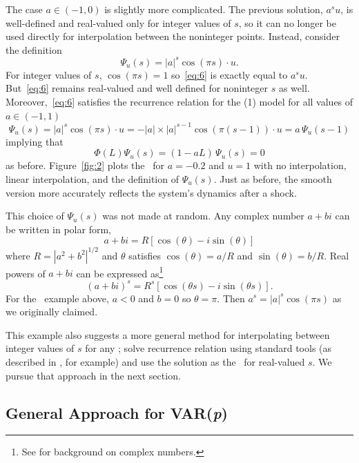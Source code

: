 \documentclass[12pt,fleqn]{article}
\begin{document}
The case $a \in (-1, 0)$ is slightly more complicated.  The previous
solution, $a^s u$, is well-defined and real-valued only for integer
values of $s$, so it can no longer be used directly for interpolation
between the noninteger points. Instead, consider the definition
\begin{equation}
  \label{eq:6}
  \Psi_u(s) = |a|^s \cos(\pi s) \cdot u.
\end{equation}
For integer values of $s$, $\cos(\pi s) = 1$ so~\eqref{eq:6} is
exactly equal to $a^s u$. But~\eqref{eq:6} remains real-valued and
well defined for noninteger $s$ as well. Moreover,~\eqref{eq:6}
satisfies the recurrence relation for the \AR(1) model for all values
of $a \in (-1,1)$
\begin{equation*}
  \Psi_u(s) = |a|^s \cos(\pi s) \cdot u = - |a| \times |a|^{s-1} \cos(\pi (s-1)) \cdot u = a \, \Psi_u(s-1)
\end{equation*}
implying that
\begin{equation*}
  \Phi(L) \Psi_u(s) = (1 - a L) \, \Psi_u(s) = 0
\end{equation*}
as before. Figure~\ref{fig:2} plots the \IRFs\ for $a = -0.2$ and
$u = 1$ with no interpolation, linear interpolation, and the
definition of $\Psi_u(s)$. Just as before, the smooth version more
accurately reflects the system's dynamics after a shock.

This choice of $\Psi_u(s)$ was not made at random. Any complex
number $a + bi$ can be written in polar form,
\[
a + bi = R [\cos(\theta) - i \sin(\theta)]
\]
where $R = |a^2 + b^2|^{1/2}$ and $\theta$ satisfies
$\cos(\theta) = a/R$ and $\sin(\theta) = b/R$. Real powers of $a + bi$
can be expressed as\footnote{%
  See \citet{Ham:94} for background on complex numbers.} %
\[
(a + bi)^s = R^s [\cos(\theta s) - i \sin(\theta s)].
\]
For the \AR\ example above, $a < 0$ and $b = 0$ so $\theta = \pi$.
Then $a^s = |a|^s \cos(\pi s)$ as we originally claimed.

This example also suggests a more general method for interpolating
between integer values of $s$ for any \VAR; solve recurrence relation
using standard tools (as described in \citealp{Ham:94}, for example)
and use the solution as the \IRF\ for real-valued $s$. We pursue that
approach in the next section.

\subsection{General Approach for VAR(\textit{p})}
\label{S2.2}
\end{document}
